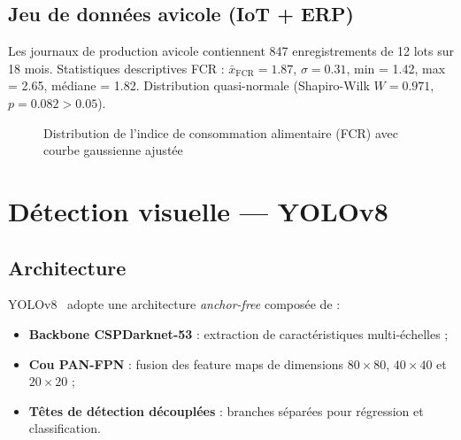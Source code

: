 \subsection{Jeu de données avicole (IoT + ERP)}
Les journaux de production avicole contiennent 847 enregistrements de 12 lots
sur 18 mois.
Statistiques descriptives FCR :
$\bar{x}_\text{FCR} = 1.87$, $\sigma = 0.31$, min = 1.42, max = 2.65,
médiane = 1.82. Distribution quasi-normale (Shapiro-Wilk $W = 0.971$,
$p = 0.082 > 0.05$).

\begin{figure}[H]
\centering
\iffast
\else
{}
\fi
\caption{Distribution de l'indice de consommation alimentaire (FCR) avec courbe gaussienne ajustée}
\label{fig:fcr_hist}
\end{figure}

\section{Détection visuelle — YOLOv8}

\subsection{Architecture}

YOLOv8~\cite{yolov8_2023} adopte une architecture \textit{anchor-free} composée de :
\begin{itemize}
  \item \textbf{Backbone CSPDarknet-53} : extraction de caractéristiques multi-échelles ;
  \item \textbf{Cou PAN-FPN} : fusion des feature maps de dimensions $80\times80$, $40\times40$ et $20\times20$ ;
  \item \textbf{Têtes de détection découplées} : branches séparées pour régression et classification.
\end{itemize}

